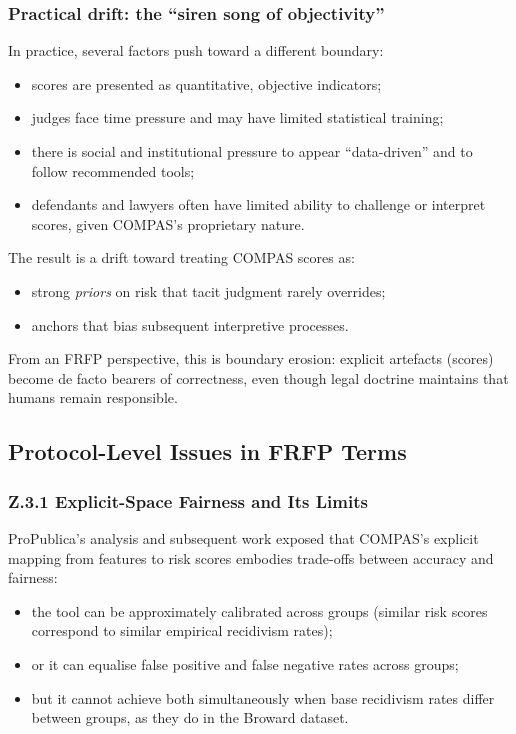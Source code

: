 \subsubsection*{Practical drift: the ``siren song of objectivity''}

In practice, several factors push toward a different boundary:

\begin{itemize}
  \item scores are presented as quantitative, objective indicators;
  \item judges face time pressure and may have limited statistical training;
  \item there is social and institutional pressure to appear ``data-driven''
        and to follow recommended tools;
  \item defendants and lawyers often have limited ability to challenge or
        interpret scores, given COMPAS’s proprietary nature.
\end{itemize}

The result is a drift toward treating COMPAS scores as:

\begin{itemize}
  \item strong \emph{priors} on risk that tacit judgment rarely overrides;
  \item anchors that bias subsequent interpretive processes.
\end{itemize}

From an FRFP perspective, this is boundary erosion:
explicit artefacts (scores) become de facto bearers of correctness, even
though legal doctrine maintains that humans remain responsible.

\subsection{Protocol-Level Issues in FRFP Terms}

\subsubsection*{Z.3.1 Explicit-Space Fairness and Its Limits}

ProPublica’s analysis and subsequent work exposed that COMPAS’s explicit
mapping from features to risk scores embodies trade-offs between accuracy
and fairness:

\begin{itemize}
  \item the tool can be approximately calibrated across groups (similar risk
        scores correspond to similar empirical recidivism rates);
  \item or it can equalise false positive and false negative rates across
        groups;
  \item but it cannot achieve both simultaneously when base recidivism rates
        differ between groups, as they do in the Broward dataset.
\end{itemize}

